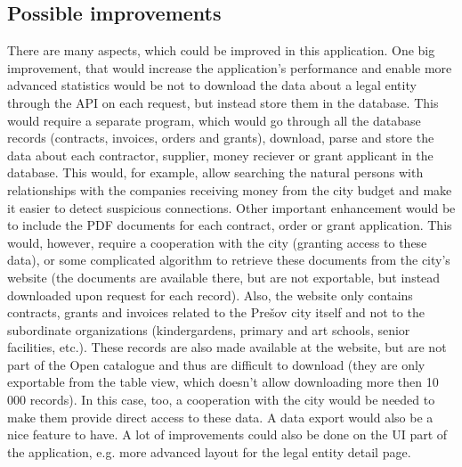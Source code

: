 \documentclass[thesis=B,english]{FITthesis}[2012/06/26]
\begin{document}
{	\subsection{Possible improvements}
	There are many aspects, which could be improved in this application. One big improvement, that would increase the application's performance and enable more advanced statistics would be not to download the data about a legal entity through the API on each request, but instead store them in the database. This would require a separate program, which would go through all the database records (contracts, invoices, orders and grants), download, parse and store the data about each contractor, supplier, money reciever or grant applicant in the database. This would, for example, allow searching the natural persons with relationships with the companies receiving money from the city budget and make it easier to detect suspicious connections. Other important enhancement would be to include the PDF documents for each contract, order or grant application. This would, however, require a cooperation with the city (granting access to these data), or some complicated algorithm to retrieve these documents from the city's website (the documents are available there, but are not exportable, but instead downloaded upon request for each record). Also, the website only contains contracts, grants and invoices related to the Prešov city itself and not to the subordinate organizations (kindergardens, primary and art schools, senior facilities, etc.). These records are also made available at the website, but are not part of the Open catalogue and thus are difficult to download (they are only exportable from the table view, which doesn't allow downloading more then 10 000 records). In this case, too, a cooperation with the city would be needed to make them provide direct access to these data. A data export would also be a nice feature to have. A lot of improvements could also be done on the UI part of the application, e.g. more advanced layout for the legal entity detail page.
\begin{conclusion}

\end{conclusion}}
\end{document}
